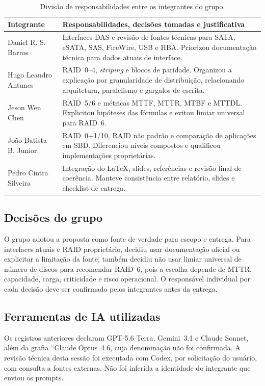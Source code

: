 \documentclass[titlepage]{article}
\begin{document}
\begin{table}[H]
    \centering
    \renewcommand{\arraystretch}{1.5}
    \begin{tabularx}{\textwidth}{|l|X|}
        \hline
        \textbf{Integrante} & \textbf{Responsabilidades, decisões tomadas e justificativa} \\
        \hline
        Daniel R. S. Barros & Interfaces DAS e revisão de fontes técnicas para SATA, eSATA, SAS, FireWire, USB e HBA. Priorizou documentação técnica para dados atuais de interface. \\
        \hline
        Hugo Leandro Antunes & RAID~0--4, \textit{striping} e blocos de paridade. Organizou a explicação por granularidade de distribuição, relacionando arquitetura, paralelismo e gargalos de escrita. \\
        \hline
        Jeson Wen Chen & RAID~5/6 e métricas MTTF, MTTR, MTBF e MTTDL. Explicitou hipóteses das fórmulas e evitou limiar universal para RAID~6. \\
        \hline
        João Batista B. Junior & RAID~0+1/10, RAID não padrão e comparação de aplicações em SBD. Diferenciou níveis compostos e qualificou implementações proprietárias. \\
        \hline
        Pedro Cintra Silveira & Integração do \LaTeX{}, slides, referências e revisão final de coerência. Manteve consistência entre relatório, slides e checklist de entrega. \\
        \hline
    \end{tabularx}
    \caption{Divisão de responsabilidades entre os integrantes do grupo.}
    \label{tab:autoria}
\end{table}

\subsection{Decisões do grupo}
O grupo adotou a proposta como fonte de verdade para escopo e entrega. Para interfaces atuais e RAID proprietário, decidiu usar documentação oficial ou explicitar a limitação da fonte; também decidiu não usar limiar universal de número de discos para recomendar RAID~6, pois a escolha depende de MTTR, capacidade, carga, criticidade e risco operacional. O responsável individual por cada decisão deve ser confirmado pelos integrantes antes da entrega.

\subsection{Ferramentas de IA utilizadas}
Os registros anteriores declaram GPT-5.6 Terra, Gemini~3.1 e Claude Sonnet, além da grafia ``Claude Optus~4.6, cuja denominação não foi confirmada. A revisão técnica desta sessão foi executada com Codex, por solicitação do usuário, com consulta a fontes externas. Não foi inferida a identidade do integrante que enviou os prompts.
\end{document}
